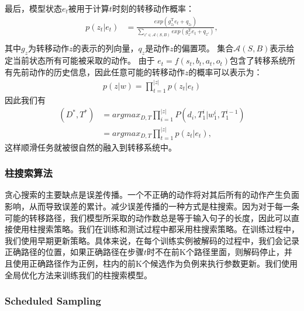    最后，模型状态$e_t$被用于计算$t$时刻的转移动作概率：
   \begin{equation}
   \begin{split}
   p(z_t | e_t) &= \frac{exp(g_{z_t}^{\mathrm{T}}e_t + q_{z_t})}{\sum_{z' \in \mathcal{A}(S,B)}exp(g_{z'}^{\mathrm{T}}e_t + q_{z'})},\nonumber \\
   \end{split}
   \end{equation}
   其中$g_z$为转移动作$z$的表示的列向量，$q_z$是动作$z$的偏置项。
   集合$\mathcal{A}(S,B)$表示给定当前状态所有可能被采取的动作。
   由于 $e_t = f (s_t , b_t , a_t, o_t) $包含了转移系统所有先前动作的历史信息，因此任意可能的转移动作$z$的概率可以表示为：
   \begin{equation}
   \begin{split}
   p(z | w) = \prod_{t=1}^{|z|}p(z_t | e_t)\nonumber
   \end{split}
   \end{equation}
   因此我们有
   \begin{equation}
   \begin{split}
   (D^*, T^*) &= argmax_{D,T}\prod_{i=1}^{|z|}P(d_i, T_1^i|w_1^i,T_1^{i-1}) \\
   &= argmax_{D,T}\prod_{t=1}^{|z|}p(z_t | e_t), \nonumber
   \end{split}
   \end{equation}
   这样顺滑任务就被很自然的融入到转移系统中。

\subsubsection*{柱搜索算法}
贪心搜索的主要缺点是误差传播。一个不正确的动作将对其后所有的动作产生负面影响，从而导致误差的累计。减少误差传播的一种方式是柱搜索。因为对于每一条可能的转移路径，我们模型所采取的动作数总是等于输入句子的长度，因此可以直接使用柱搜索策略。我们在训练和测试过程中都采用柱搜索策略。在训练过程中，我们使用早期更新策略。具体来说，在每个训练实例被解码的过程中，我们会记录正确路径的位置，如果正确路径在步骤$t$时不在前K个路径里面，则解码停止，并且使用正确路径作为正例，柱内的前K个候选作为负例来执行参数更新。我们使用全局优化方法来训练我们的柱搜索模型。
\subsubsection*{Scheduled Sampling}

